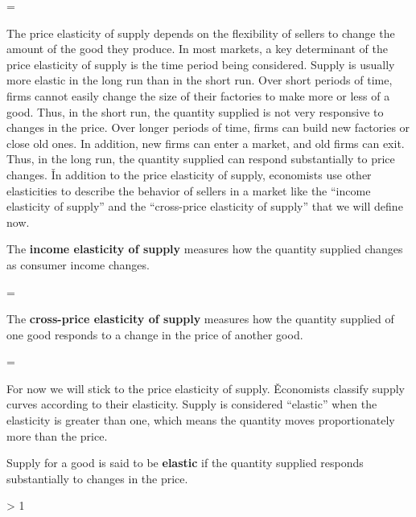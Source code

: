 \bse
{} = 
{}
\ese
\ed

The price elasticity of supply depends on the flexibility of sellers to change the amount of the good they produce.
In most markets, a key determinant of the price elasticity of supply is the time period being considered. Supply is
usually more elastic in the long run than in the short run. Over short periods of time, firms cannot easily change
the size of their factories to make more or less of a good. Thus, in the short run, the quantity supplied is not very
responsive to changes in the price. Over longer periods of time, firms can build new factories or close old ones. In
addition, new firms can enter a market, and old firms can exit. Thus, in the long run, the quantity supplied can
respond substantially to price changes. \v

In addition to the price elasticity of supply, economists use other elasticities to describe the behavior of sellers
in a market like the ``income elasticity of supply'' and the ``cross-price elasticity of supply'' that we will define
now.

The \textbf{income elasticity of supply} measures how the quantity supplied changes as consumer income changes.

\bse
{} = 
{}
\ese
\ed

The \textbf{cross-price elasticity of supply} measures how the quantity supplied of one good responds to a change in the
price of another good.

\bse
{} = 
{}
\ese
\ed

For now we will stick to the price elasticity of supply. \v

Economists classify supply curves according to their elasticity. Supply is considered ``elastic'' when the elasticity
is greater than one, which means the quantity moves proportionately more than the price.

Supply for a good is said to be \textbf{elastic} if the quantity supplied responds substantially to changes in the
price.

\bse
{} > 1
\ese
\ed

